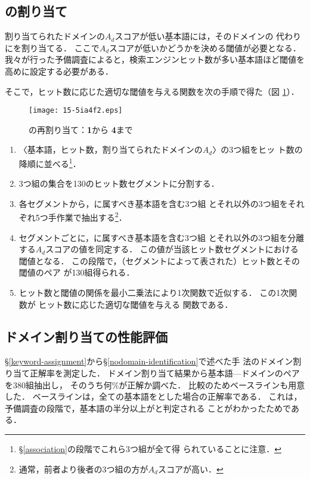 \documentclass[japanese]{jnlp_1.4}
\newcommand{\dom}[1]{}
\begin{document}
\subsection{\dom{ドメイン無し}の割り当て
  \label{nodomain-identification}}

割り当てられたドメインの$A_d$スコアが低い基本語には，そのドメインの
代わりに\dom{ドメイン無し}を割り当てる．
ここで$A_d$スコアが低いかどうかを決める閾値が必要となる．
我々が行った予備調査によると，検索エンジンヒット数が多い基本語ほど閾値を
高めに設定する必要がある．

そこで，ヒット数に応じた適切な閾値を与える関数を次の手順で得た（図
\ref{reassociation-nodomain}）．

\begin{figure}[b]
\begin{center}
\texttt{[image: 15-5ia4f2.eps]}
\end{center}
\caption{\dom{ドメイン無し}の再割り当て：\textbf{1}から
\textbf{4}まで}
\label{reassociation-nodomain}
\end{figure}

\begin{enumerate}
 \item 〈基本語，ヒット数，割り当てられたドメインの$A_d$〉の3つ組をヒッ
ト数の降順に並べる\footnote{
\S\ref{association}の段階でこれら3つ組が全て得
られていることに注意．
}．
 \item 3つ組の集合を130のヒット数セグメントに分割する．
 \item 各セグメントから，\dom{ドメイン無し}に属すべき基本語を含む3つ組
とそれ以外の3つ組をそれぞれ5つ手作業で抽出する\footnote{
通常，前者より後者の3つ組の方が$A_d$スコアが高い．
}．
 \item セグメントごとに，\dom{ドメイン無し}に属すべき基本語を含む3つ組
とそれ以外の3つ組を分離する$A_d$スコアの値を同定する．
この値が当該ヒット数セグメントにおける閾値となる．
この段階で，（セグメントによって表された）ヒット数とその閾値のペア
が130組得られる．
 \item ヒット数と閾値の関係を最小二乗法により1次関数で近似する．
この1次関数が
ヒット数に応じた適切な閾値を与える
関数である．
\end{enumerate}


\subsection{ドメイン割り当ての性能評価}

\S\ref{keyword-assignment}から\S\ref{nodomain-identification}で述べた手
法のドメイン割り当て正解率を測定した．
\pagebreak
ドメイン割り当て結果から基本語—ドメインのペアを380組抽出し，
そのうち何\%が正解か調べた．
比較のためベースラインも用意した．
ベースラインは，全ての基本語を\dom{ドメイン無し}とした場合の正解率である．
これは，予備調査の段階で，基本語の半分以上が\dom{ドメイン無し}と判定される
ことがわかったためである．
\end{document}
